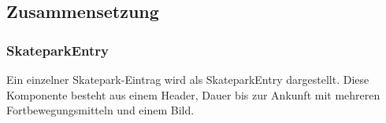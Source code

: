 

\subsection{Zusammensetzung}
\subsubsection{SkateparkEntry}
Ein einzelner Skatepark-Eintrag wird als SkateparkEntry dargestellt. Diese Komponente besteht aus
einem Header, Dauer bis zur Ankunft mit mehreren Fortbewegungsmitteln und einem Bild.

\begin{lstlisting}
  
\end{lstlisting}

